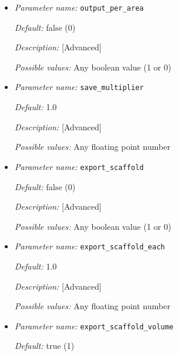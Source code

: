 \begin{itemize}
{\it Possible values:} Any boolean value (1 or 0)


\item {\it Parameter name:} {\tt output\_per\_area}
\label{parameters:output_per_area}


{\it Default:} false (0)

{\it Description:} [Advanced] 

{\it Possible values:} Any boolean value (1 or 0)


\item {\it Parameter name:} {\tt save\_multiplier}
\label{parameters:save_multiplier}


{\it Default:} 1.0

{\it Description:} [Advanced] 

{\it Possible values:} Any floating point number


\item {\it Parameter name:} {\tt export\_scaffold}
\label{parameters:export_scaffold}


{\it Default:} false (0)

{\it Description:} [Advanced] 

{\it Possible values:} Any boolean value (1 or 0)


\item {\it Parameter name:} {\tt export\_scaffold\_each}
\label{parameters:export_scaffold_each}


{\it Default:} 1.0

{\it Description:} [Advanced] 

{\it Possible values:} Any floating point number


\item {\it Parameter name:} {\tt export\_scaffold\_volume}
\label{parameters:export_scaffold_volume}


{\it Default:} true (1)


\end{itemize}
